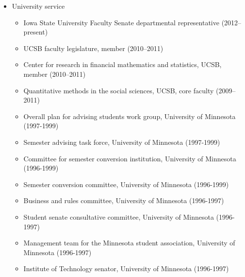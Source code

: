 \documentclass[overlapped,line]{res}
\begin{document}
\begin{resume}
\begin{itemize}
\item University service
\begin{itemize}
\item Iowa State University Faculty Senate departmental representative (2012--present)
\item UCSB faculty legislature, member (2010--2011)
\item Center for research in financial mathematics and statistics, UCSB, member (2010--2011)
\item Quantitative methods in the social sciences, UCSB, core faculty (2009--2011)
\item Overall plan for advising students work group, University of Minnesota (1997-1999)
\item Semester advising task force, University of Minnesota (1997-1999)
\item Committee for semester conversion institution, University of Minnesota (1996-1999)
\item Semester conversion committee, University of Minnesota (1996-1999)
\item Business and rules committee, University of Minnesota (1996-1997)
\item Student senate consultative committee, University of Minnesota (1996-1997)
\item Management team for the Minnesota student association, University of Minnesota (1996-1997)
\item Institute of Technology senator, University of Minnesota (1996-1997)
 \end{itemize}


\end{itemize}
\end{resume}
\end{document}
